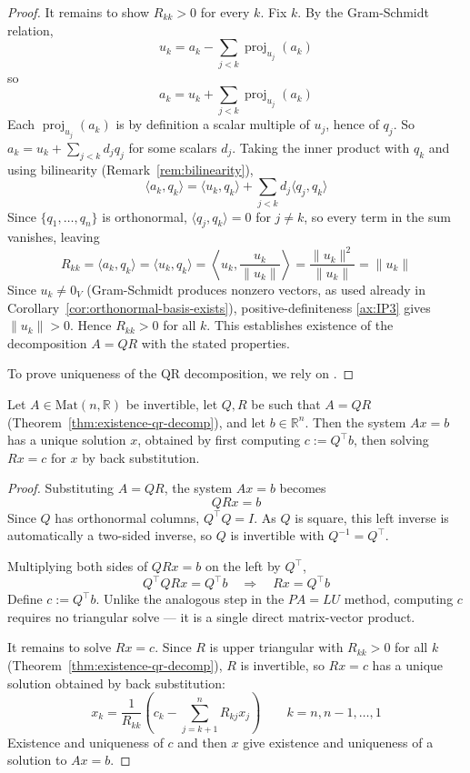 \begin{proof}
			It remains to show $R_{kk} > 0$ for every $k$. Fix $k$. By the Gram-Schmidt relation,
			\[
				u_k = a_k - \sum_{j<k} \operatorname{proj}_{u_j}(a_k)
			\]
			so
			\[
				a_k = u_k + \sum_{j<k} \operatorname{proj}_{u_j}(a_k)
			\]
			Each $\operatorname{proj}_{u_j}(a_k)$ is by definition a scalar multiple of $u_j$, hence of $q_j$. So $a_k = u_k + \sum_{j<k} d_j q_j$ for some scalars $d_j$. Taking the inner product with $q_k$ and using bilinearity (Remark~\ref{rem:bilinearity}),
			\[
				\langle a_k, q_k \rangle = \langle u_k, q_k \rangle + \sum_{j<k} d_j \langle q_j, q_k \rangle
			\]
			Since $\{q_1,\dots,q_n\}$ is orthonormal, $\langle q_j,q_k\rangle = 0$ for $j \neq k$, so every term in the sum vanishes, leaving
			\[
				R_{kk} = \langle a_k, q_k \rangle = \langle u_k, q_k \rangle = \left\langle u_k, \frac{u_k}{\|u_k\|} \right\rangle = \frac{\|u_k\|^2}{\|u_k\|} = \|u_k\|
			\]
			Since $u_k \neq 0_V$ (Gram-Schmidt produces nonzero vectors, as used already in Corollary~\ref{cor:orthonormal-basis-exists}), positive-definiteness \ref{ax:IP3} gives $\|u_k\| > 0$. Hence $R_{kk} > 0$ for all $k$. This establishes existence of the decomposition $A = QR$ with the stated properties.
			
			To prove uniqueness of the QR decomposition, we rely on \cite[\S5.2]{GolubVanLoan2013}.
		\end{proof}
		
		\begin{proposition}[Solving $Ax=b$ via $A=QR$]
			\label{prop:solve-qr}
			Let $A \in \mathrm{Mat}(n,\mathbb{R})$ be invertible, let $Q, R$ be such that $A = QR$ (Theorem~\ref{thm:existence-qr-decomp}), and let $b \in \mathbb{R}^n$. Then the system $Ax=b$ has a unique solution $x$, obtained by first computing $c := Q^\top b$, then solving $Rx = c$ for $x$ by back substitution.
		\end{proposition}
		
		\begin{proof}
			Substituting $A = QR$, the system $Ax=b$ becomes
			\[
				QRx = b
			\]
			Since $Q$ has orthonormal columns, $Q^\top Q = I$. As $Q$ is square, this left inverse is automatically a two-sided inverse, so $Q$ is invertible with $Q^{-1} = Q^\top$.
			
			Multiplying both sides of $QRx=b$ on the left by $Q^\top$,
			\[
				Q^\top Q R x = Q^\top b \quad \Longrightarrow \quad Rx = Q^\top b
			\]
			Define $c := Q^\top b$. Unlike the analogous step in the $PA=LU$ method, computing $c$ requires no triangular solve — it is a single direct matrix-vector product.
			
			It remains to solve $Rx = c$. Since $R$ is upper triangular with $R_{kk} > 0$ for all $k$ (Theorem~\ref{thm:existence-qr-decomp}), $R$ is invertible, so $Rx=c$ has a unique solution obtained by back substitution:
			\[
				x_k = \frac{1}{R_{kk}}\left(c_k - \sum_{j=k+1}^{n} R_{kj}x_j\right) \qquad k = n, n-1, \dots, 1
			\]
			Existence and uniqueness of $c$ and then $x$ give existence and uniqueness of a solution to $Ax=b$.
		\end{proof}
		
